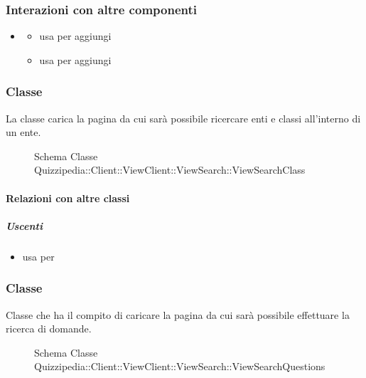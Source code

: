 \subsubsection{Interazioni con altre componenti}
\begin{itemize}
\item {}
\begin{itemize}
\item usa  per aggiungi
\item usa  per aggiungi
\end{itemize}
\end{itemize}
\subsubsection{Classe }
La classe carica la pagina da cui sarà possibile ricercare enti e classi all'interno di un ente.
\begin{figure}[H]
\centering
\noindent{}
\caption[Schema Classe ViewSearchClass]{Schema Classe Quizzipedia::Client::ViewClient::ViewSearch::ViewSearchClass}
\end{figure}
\paragraph{Relazioni con altre classi}
\subparagraph{Uscenti}
\begin{itemize}
\item usa  per 
\end{itemize}
\subsubsection{Classe }
Classe che ha il compito di caricare la pagina da cui sarà possibile effettuare la ricerca di domande.
\begin{figure}[H]
\centering
\noindent{}
\caption[Schema Classe ViewSearchQuestions]{Schema Classe Quizzipedia::Client::ViewClient::ViewSearch::ViewSearchQuestions}
\end{figure}
